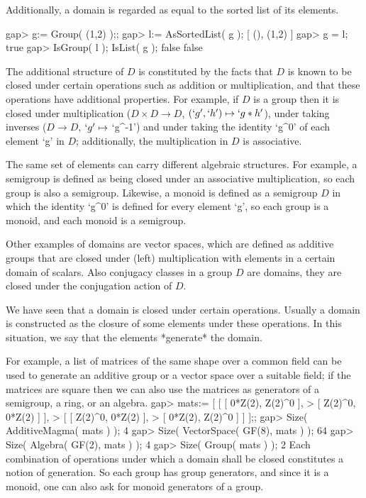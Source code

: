 Additionally, a domain is regarded as equal to the sorted list
of its elements.

\beginexample
gap> g:= Group( (1,2) );;
gap> l:= AsSortedList( g );
[ (), (1,2) ]
gap> g = l;
true
gap> IsGroup( l ); IsList( g );
false
false
\endexample



The additional structure of $D$ is constituted by the facts that $D$ is
known to be closed under certain operations such as addition or
multiplication, and that these operations have additional properties.
For example, if $D$ is a group then it is closed under multiplication
($D \times D \rightarrow D$, $(`g',`h') \mapsto `g * h'$),
under taking inverses ($D \rightarrow D$, $`g' \mapsto$ `g^-1')
and under taking the identity `g^0' of each element `g' in $D$;
additionally, the multiplication in $D$ is associative.

The same set of elements can carry different algebraic structures.
For example, a semigroup is defined as being closed under an associative
multiplication, so each group is also a semigroup.
Likewise, a monoid is defined as a semigroup $D$ in which the identity
`g^0' is defined for every element `g', so each group is a monoid,
and each monoid is a semigroup.

Other examples of domains are vector spaces, which are defined as
additive groups that are closed under (left) multiplication with elements
in a certain domain of scalars.
Also conjugacy classes in a group $D$ are domains,
they are closed under the conjugation action of $D$.



We have seen that a domain is closed under certain operations.
Usually a domain is constructed as the closure of some elements under
these operations.
In this situation, we say that the elements *generate* the domain.

For example, a list of matrices of the same shape over a common field can
be used to generate an additive group or a vector space over a suitable
field; 
if the matrices are square then we can also use the matrices as generators
of a semigroup, a ring, or an algebra.
\beginexample
gap> mats:= [ [ [ 0*Z(2), Z(2)^0 ],
>               [ Z(2)^0, 0*Z(2) ] ], 
>             [ [ Z(2)^0, 0*Z(2) ],
>               [ 0*Z(2), Z(2)^0 ] ] ];;
gap> Size( AdditiveMagma( mats ) );
4
gap> Size( VectorSpace( GF(8), mats ) );
64
gap> Size( Algebra( GF(2), mats ) );    
4
gap> Size( Group( mats ) );         
2
\endexample
Each combination of operations under which a domain shall be closed
constitutes a notion of generation.
So each group has group generators, and since it is a monoid,
one can also ask for monoid generators of a group.

